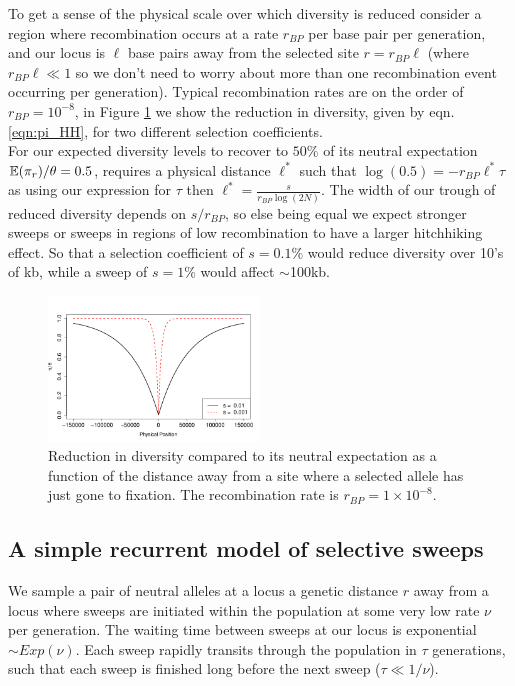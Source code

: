 To get a sense of the physical scale over which diversity is reduced
consider a region where recombination occurs at a rate $r_{BP}$ per
base pair per generation, and our locus is $ \ell $ base pairs away from the
selected site $r=r_{BP } \ell $ (where $r_{BP}  \ell  \ll 1$ so we don't need to
worry about more than one recombination event occurring per
generation). Typical
recombination rates are on the order of $r_{BP} = 10^{-8}$, in Figure
\ref{fig:hitchhiking_reduction} we show the reduction in diversity,
given by eqn. \eqref{eqn:pi_HH}, for two different selection coefficients.\\ 

For our expected diversity levels to recover to $50\%$ of
its neutral expectation $\mathbb{E}(\pi_r)/\theta=0.5$, requires a physical
distance $\ell^{*}$ such that $\log(0.5) = -r_{BP} \ell ^*\tau$ as using our
expression for $\tau$ then $ \ell^* = \frac{s}{r_{BP} \log (2N) }$. The width of our trough of reduced diversity depends on $s/r_{BP}$,
so  else being equal we expect stronger sweeps or sweeps in regions of low
recombination to have a larger hitchhiking effect. So that a selection coefficient of $s=0.1\%$ would reduce
diversity over 10's of kb, while a sweep of $s=1\%$ would affect
$\sim$100kb.   \\


\begin{figure}
\begin{center}
\includegraphics[width=0.5\textwidth]{figures/hitchhiking_reduction.png}
\end{center}
\caption{Reduction in diversity compared to its neutral expectation as
a function of the distance away from a site where a selected allele
has just gone to fixation. The recombination rate is $r_{BP}= 1\times
10^{-8}$.} \label{fig:hitchhiking_reduction}
\end{figure}

\subsection{A simple recurrent model of selective sweeps}
We sample a pair of neutral alleles at a locus a genetic distance $r$ away from a locus where
sweeps are initiated within the population at some very low rate $\nu$
per generation. The waiting time between sweeps
at our locus is exponential $\sim Exp(\nu)$. Each sweep rapidly transits through the population in $\tau$
generations, such that each sweep is finished long before the next
sweep ($\tau \ll 1/\nu$). \\

